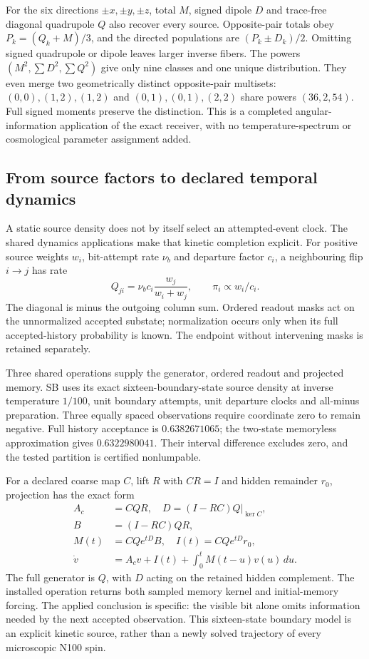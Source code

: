 For the six directions $\pm x,\pm y,\pm z$, total $M$, signed dipole $D$ and trace-free diagonal quadrupole $Q$ also recover every source. Opposite-pair totals obey $P_k=(Q_k+M)/3$, and the directed populations are $(P_k\pm D_k)/2$. Omitting signed quadrupole or dipole leaves larger inverse fibers. The powers $(M^2,\sum D^2,\sum Q^2)$ give only nine classes and one unique distribution. They even merge two geometrically distinct opposite-pair multisets: $(0,0),(1,2),(1,2)$ and $(0,1),(0,1),(2,2)$ share powers $(36,2,54)$. Full signed moments preserve the distinction. This is a completed angular-information application of the exact receiver, with no temperature-spectrum or cosmological parameter assignment added.

\subsection{From source factors to declared temporal dynamics}

A static source density does not by itself select an attempted-event clock. The shared dynamics applications make that kinetic completion explicit. For positive source weights $w_i$, bit-attempt rate $\nu_b$ and departure factor $c_i$, a neighbouring flip $i\to j$ has rate
\[
 Q_{ji}=\nu_b c_i\frac{w_j}{w_i+w_j},
 \qquad \pi_i\propto w_i/c_i.
\]
The diagonal is minus the outgoing column sum. Ordered readout masks act on the unnormalized accepted substate; normalization occurs only when its full accepted-history probability is known. The endpoint without intervening masks is retained separately. 

Three shared operations supply the generator, ordered readout and projected memory. SB uses its exact sixteen-boundary-state source density at inverse temperature $1/100$, unit boundary attempts, unit departure clocks and all-minus preparation. Three equally spaced observations require coordinate zero to remain negative. Full history acceptance is $0.6382671065$; the two-state memoryless approximation gives $0.6322980041$. Their interval difference excludes zero, and the tested partition is certified nonlumpable.

For a declared coarse map $C$, lift $R$ with $CR=I$ and hidden remainder $r_0$, projection has the exact form
\[
 \begin{aligned}
 A_c&=CQR,\quad D=(I-RC)Q|_{\ker C},\\
 B&=(I-RC)QR,\\
 M(t)&=CQe^{tD}B,\quad I(t)=CQe^{tD}r_0,\\
 \dot v&=A_cv+I(t)+\int_0^tM(t-u)v(u)\,du.
 \end{aligned}
\]
The full generator is $Q$, with $D$ acting on the retained hidden complement. The installed operation returns both sampled memory kernel and initial-memory forcing. The applied conclusion is specific: the visible bit alone omits information needed by the next accepted observation. This sixteen-state boundary model is an explicit kinetic source, rather than a newly solved trajectory of every microscopic N100 spin.

